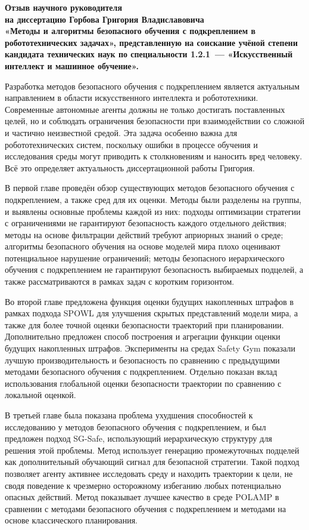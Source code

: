 \documentclass[a4paper,14pt]{extarticle}
\begin{document}
\begin{center}
\begin{minipage}{\linewidth}
\centering\bfseries
Отзыв научного руководителя\\
на диссертацию Горбова Григория Владиславовича\\
«Методы и алгоритмы безопасного обучения с подкреплением в робототехнических задачах», представленную на соискание учёной степени кандидата технических наук по специальности 1.2.1~--- «Искусственный интеллект и машинное обучение».
\end{minipage}
\end{center}

Разработка методов безопасного обучения с подкреплением является актуальным направлением в области искусственного интеллекта и робототехники. Современные автономные агенты должны не только достигать поставленных целей, но и соблюдать ограничения безопасности при взаимодействии со сложной и частично неизвестной средой. Эта задача особенно важна для робототехнических систем, поскольку ошибки в процессе обучения и исследования среды могут приводить к столкновениям и наносить вред человеку. Всё это определяет актуальность диссертационной работы Григория.

В первой главе проведён обзор существующих методов безопасного обучения с подкреплением, а также сред для их оценки. Методы были разделены на группы, и выявлены основные проблемы каждой из них: подходы оптимизации стратегии с ограничениями не гарантируют безопасность каждого отдельного действия; методы на основе фильтрации действий требуют априорных знаний о среде; алгоритмы безопасного обучения на основе моделей мира плохо оценивают потенциальное нарушение ограничений; методы безопасного иерархического обучения с подкреплением не гарантируют безопасность выбираемых подцелей, а также рассматриваются в рамках задач с коротким горизонтом.

Во второй главе предложена функция оценки будущих накопленных штрафов в рамках подхода SPOWL для улучшения скрытых представлений модели мира, а также для более точной оценки безопасности траекторий при планировании. Дополнительно предложен способ построения и агрегации функции оценки будущих накопленных штрафов. Эксперименты на средах Safety Gym показали лучшую производительность и безопасность по сравнению с предыдущими методами безопасного обучения с подкреплением. Отдельно показан вклад использования глобальной оценки безопасности траектории по сравнению с локальной оценкой.

В третьей главе была показана проблема ухудшения способностей к исследованию у методов безопасного обучения с подкреплением, и был предложен подход SG-Safe, использующий иерархическую структуру для решения этой проблемы. Метод использует генерацию промежуточных подцелей как дополнительный обучающий сигнал для безопасной стратегии. Такой подход позволяет агенту активнее исследовать среду и находить траектории к цели, не сводя поведение к чрезмерно осторожному избеганию любых потенциально опасных действий. Метод показывает лучшее качество в среде POLAMP в сравнении с методами безопасного обучения с подкреплением и методами на основе классического планирования.
\end{document}
